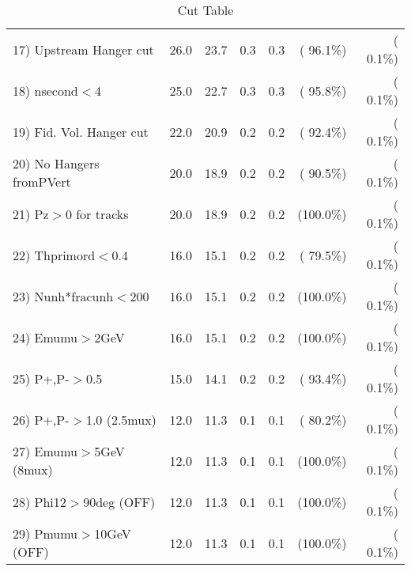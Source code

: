 \begin{table}[h!]
\begin{tabular}{||l||r|r|r|r|r|r||}
 17) Upstream Hanger cut  &         26.0 &         23.7 &          0.3 &          0.3 & ( 96.1\%) & (  0.1\%) \\
 18) nsecond$<$4          &         25.0 &         22.7 &          0.3 &          0.3 & ( 95.8\%) & (  0.1\%) \\
 19) Fid. Vol. Hanger cut &         22.0 &         20.9 &          0.2 &          0.2 & ( 92.4\%) & (  0.1\%) \\
 20) No Hangers fromPVert &         20.0 &         18.9 &          0.2 &          0.2 & ( 90.5\%) & (  0.1\%) \\
 21) Pz$>$0 for tracks    &         20.0 &         18.9 &          0.2 &          0.2 & (100.0\%) & (  0.1\%) \\
 22) Thprimord$<$0.4      &         16.0 &         15.1 &          0.2 &          0.2 & ( 79.5\%) & (  0.1\%) \\
 23) Nunh*fracunh$<$200   &         16.0 &         15.1 &          0.2 &          0.2 & (100.0\%) & (  0.1\%) \\
 24) Emumu$>$2GeV         &         16.0 &         15.1 &          0.2 &          0.2 & (100.0\%) & (  0.1\%) \\
 25) P+,P-$>$0.5          &         15.0 &         14.1 &          0.2 &          0.2 & ( 93.4\%) & (  0.1\%) \\
 26) P+,P-$>$1.0 (2.5mux) &         12.0 &         11.3 &          0.1 &          0.1 & ( 80.2\%) & (  0.1\%) \\
 27) Emumu$>$5GeV  (8mux) &         12.0 &         11.3 &          0.1 &          0.1 & (100.0\%) & (  0.1\%) \\
 28) Phi12$>$90deg  (OFF) &         12.0 &         11.3 &          0.1 &          0.1 & (100.0\%) & (  0.1\%) \\
 29) Pmumu$>$10GeV  (OFF) &         12.0 &         11.3 &          0.1 &          0.1 & (100.0\%) & (  0.1\%) \\
 \hline
 \hline
 \end{tabular}
 \caption{Cut Table           }
 \label{tab-cutcohjpsi-mumu_anuecc}
 \end{table}
